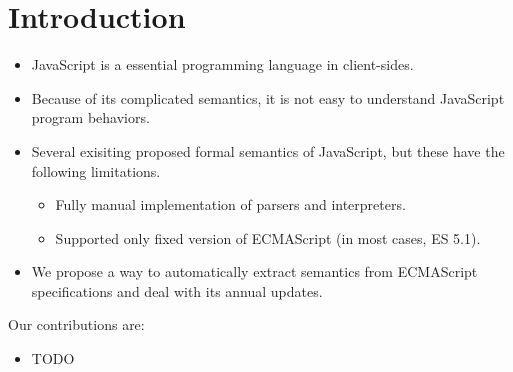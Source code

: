 \section{Introduction}

\begin{itemize}
  \item JavaScript is a essential programming language in client-sides.
  \item Because of its complicated semantics, it is not easy to understand JavaScript program behaviors.
  \item Several exisiting proposed formal semantics of JavaScript, but these have the following limitations.
    \begin{itemize}
      \item Fully manual implementation of parsers and interpreters.
      \item Supported only fixed version of ECMAScript (in most cases, ES 5.1).
    \end{itemize}
  \item We propose a way to automatically extract semantics from ECMAScript specifications and deal with its annual updates.
\end{itemize}

Our contributions are:
\begin{itemize}
  \item TODO
\end{itemize}

% 
